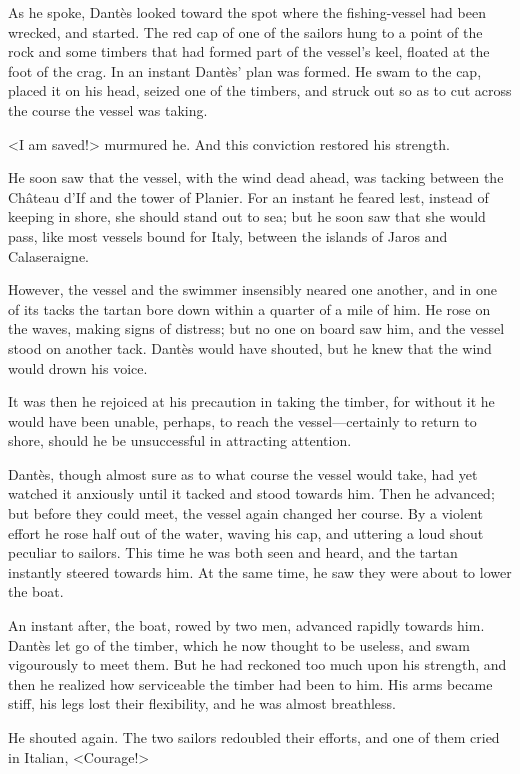  As he spoke, Dantès looked toward the spot where the fishing-vessel had been wrecked, and started. The red cap of one of the sailors hung to a point of the rock and some timbers that had formed part of the vessel's keel, floated at the foot of the crag. In an instant Dantès' plan was formed. He swam to the cap, placed it on his head, seized one of the timbers, and struck out so as to cut across the course the vessel was taking. 

 <I am saved!> murmured he. And this conviction restored his strength. 

 He soon saw that the vessel, with the wind dead ahead, was tacking between the Château d'If and the tower of Planier. For an instant he feared lest, instead of keeping in shore, she should stand out to sea; but he soon saw that she would pass, like most vessels bound for Italy, between the islands of Jaros and Calaseraigne. 

 However, the vessel and the swimmer insensibly neared one another, and in one of its tacks the tartan bore down within a quarter of a mile of him. He rose on the waves, making signs of distress; but no one on board saw him, and the vessel stood on another tack. Dantès would have shouted, but he knew that the wind would drown his voice. 

 It was then he rejoiced at his precaution in taking the timber, for without it he would have been unable, perhaps, to reach the vessel—certainly to return to shore, should he be unsuccessful in attracting attention. 

 Dantès, though almost sure as to what course the vessel would take, had yet watched it anxiously until it tacked and stood towards him. Then he advanced; but before they could meet, the vessel again changed her course. By a violent effort he rose half out of the water, waving his cap, and uttering a loud shout peculiar to sailors. This time he was both seen and heard, and the tartan instantly steered towards him. At the same time, he saw they were about to lower the boat. 

 An instant after, the boat, rowed by two men, advanced rapidly towards him. Dantès let go of the timber, which he now thought to be useless, and swam vigourously to meet them. But he had reckoned too much upon his strength, and then he realized how serviceable the timber had been to him. His arms became stiff, his legs lost their flexibility, and he was almost breathless. 

 He shouted again. The two sailors redoubled their efforts, and one of them cried in Italian, <Courage!> 

